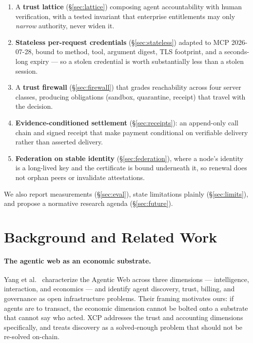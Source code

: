 \documentclass[11pt]{article}
\begin{document}
\begin{enumerate}[leftmargin=1.4em,itemsep=0.15em]
\item A \textbf{trust lattice} (\S\ref{sec:lattice}) composing agent
      accountability with human verification, with a tested invariant that
      enterprise entitlements may only \emph{narrow} authority, never widen it.
\item \textbf{Stateless per-request credentials} (\S\ref{sec:stateless}) adapted
      to MCP 2026-07-28, bound to method, tool, argument digest, TLS footprint,
      and a seconds-long expiry --- so a stolen credential is worth
      substantially less than a stolen session.
\item A \textbf{trust firewall} (\S\ref{sec:firewall}) that grades reachability
      across four server classes, producing obligations (sandbox, quarantine,
      receipt) that travel with the decision.
\item \textbf{Evidence-conditioned settlement} (\S\ref{sec:receipts}): an
      append-only call chain and signed receipt that make payment conditional on
      verifiable delivery rather than asserted delivery.
\item \textbf{Federation on stable identity} (\S\ref{sec:federation}), where a
      node's identity is a long-lived key and the certificate is bound
      underneath it, so renewal does not orphan peers or invalidate
      attestations.
\end{enumerate}

We also report measurements (\S\ref{sec:eval}), state limitations plainly
(\S\ref{sec:limits}), and propose a normative research agenda
(\S\ref{sec:future}).

\section{Background and Related Work}

\paragraph{The agentic web as an economic substrate.}
Yang et al.~\cite{yang2025} characterize the Agentic Web across three
dimensions --- intelligence, interaction, and economics --- and identify agent
discovery, trust, billing, and governance as open infrastructure problems. Their
framing motivates ours: if agents are to transact, the economic dimension cannot
be bolted onto a substrate that cannot say who acted. XCP addresses the trust and
accounting dimensions specifically, and treats discovery as a solved-enough
problem that should not be re-solved on-chain.
\end{document}
